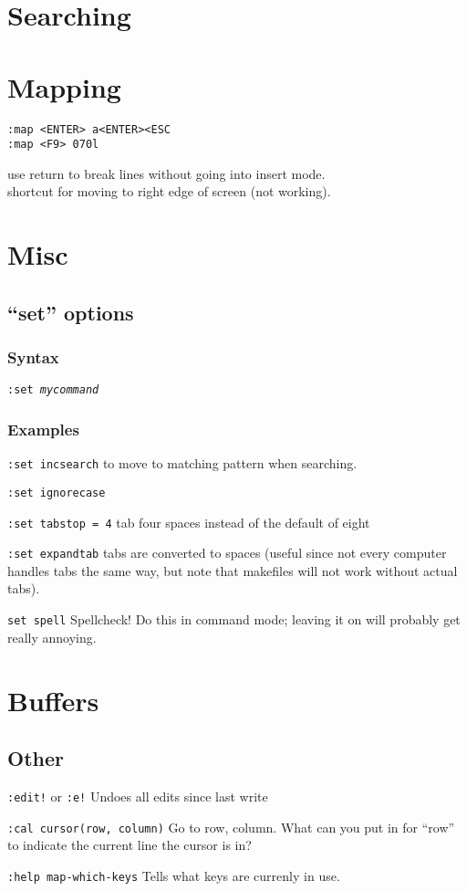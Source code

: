 \documentclass{article}
\begin{document}
\section{Searching}

\section{Mapping}
\begin{minipage}[t]{0.4\textwidth}
    \texttt{:map <ENTER> a<ENTER><ESC}\\
    \texttt{:map <F9> 070l}\\
\end{minipage}
\begin{minipage}[t]{0.7\textwidth}
    use return to break lines without going into insert mode.\\
    shortcut for moving to right edge of screen (not working).\\
\end{minipage}

\section{Misc}

\subsection{``set'' options}
\subsubsection{Syntax}
\texttt{:set \emph{mycommand}}
\subsubsection{Examples}
\par\texttt{:set incsearch} to move to matching pattern when searching.
\par\texttt{:set ignorecase}
\par\texttt{:set tabstop = 4} tab four spaces instead of the default of eight
\par\texttt{:set expandtab} tabs are converted to spaces (useful since not every
computer handles tabs the same way, but note that makefiles will not
work without actual tabs).
\par\texttt{set spell} Spellcheck! Do this in command mode; leaving it on
will probably get really annoying.

\section{Buffers}

\subsection{Other}
\par\texttt{:edit!} or \texttt{:e!} Undoes all edits since last write
\par\texttt{:cal cursor(row, column)} Go to row, column. What can you put
in for ``row'' to indicate the current line the cursor is in?
\par\texttt{:help map-which-keys} Tells what keys are currenly in use.
\end{document}
